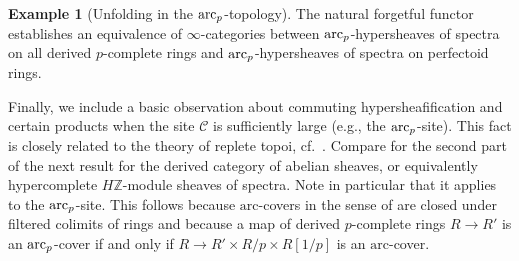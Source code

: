\documentclass{amsart}
\newcommand{\psh}{\mathrm{PSh}}
\theoremstyle{definition}
\newtheorem{example}[theorem]{Example}
\begin{document}
\begin{example}[Unfolding in the $\mathrm{arc}_{{p}}$-topology]  
\label{arcunfolding}
The 
natural forgetful functor establishes an equivalence of $\infty$-categories
between $\mathrm{arc}_{{p}}$-hypersheaves of spectra on all derived $p$-complete rings and
$\mathrm{arc}_{{p}}$-hypersheaves of
spectra on perfectoid rings. 
\end{example} 


Finally, we include a basic observation about commuting hypersheafification and
certain products when the site $\mathcal{C}$ is sufficiently large (e.g., the
$\mathrm{arc}_{{p}}$-site). 
This fact is closely related to the theory of replete topoi,
cf.~\cite[Sec.~3]{BSproet}. Compare \cite[Prop.~3.3.3]{BSproet} for the second
part of the next result for the derived category of abelian sheaves, or
equivalently hypercomplete $H\mathbb{Z}$-module sheaves of spectra.  
Note in particular that it applies to the $\mathrm{arc}_{{p}}$-site. 
This follows because 
$\mathrm{arc}$-covers in the sense of \cite{BM18} are closed under filtered
colimits of rings 
\cite[Cor.~2.20]{BM18} and because a map of derived $p$-complete rings $R \to
R'$ is an $\mathrm{arc}_{{p}}$-cover if and only if $R \to R' \times R/p \times R[1/p]$ is an
$\mathrm{arc}$-cover. 

\newcommand{\pshc}{\psh_{\sqcup}}
\end{document}
